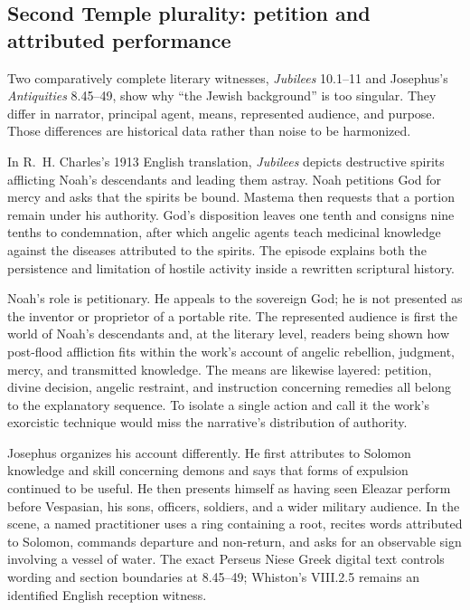 \subsection{Second Temple plurality: petition and attributed performance}

Two comparatively complete literary witnesses, \emph{Jubilees} 10.1--11 and
Josephus's \emph{Antiquities} 8.45--49, show why ``the Jewish background'' is
too singular. They differ in narrator, principal agent, means, represented
audience, and purpose. Those differences are historical data rather than
noise to be harmonized.

In R.~H. Charles's 1913 English translation, \emph{Jubilees} depicts
destructive spirits afflicting Noah's descendants and leading them astray.
Noah petitions God for mercy and asks that the spirits be bound. Mastema then
requests that a portion remain under his authority. God's disposition leaves
one tenth and consigns nine tenths to condemnation, after which angelic agents
teach medicinal knowledge against the diseases attributed to the spirits.
The episode explains both the persistence and limitation of hostile activity
inside a rewritten scriptural history.

Noah's role is petitionary. He appeals to the sovereign God; he is not
presented as the inventor or proprietor of a portable rite. The represented
audience is first the world of Noah's descendants and, at the literary level,
readers being shown how post-flood affliction fits within the work's account
of angelic rebellion, judgment, mercy, and transmitted knowledge. The means
are likewise layered: petition, divine decision, angelic restraint, and
instruction concerning remedies all belong to the explanatory sequence. To
isolate a single action and call it the work's exorcistic technique would miss
the narrative's distribution of authority.

Josephus organizes his account differently. He first attributes to Solomon
knowledge and skill concerning demons and says that forms of expulsion
continued to be useful. He then presents himself as having seen Eleazar
perform before Vespasian, his sons, officers, soldiers, and a wider military
audience. In the scene, a named practitioner uses a ring containing a root,
recites words attributed to Solomon, commands departure and non-return, and
asks for an observable sign involving a vessel of water. The exact Perseus
Niese Greek digital text controls wording and section boundaries at
8.45--49; Whiston's VIII.2.5 remains an identified English reception witness.

